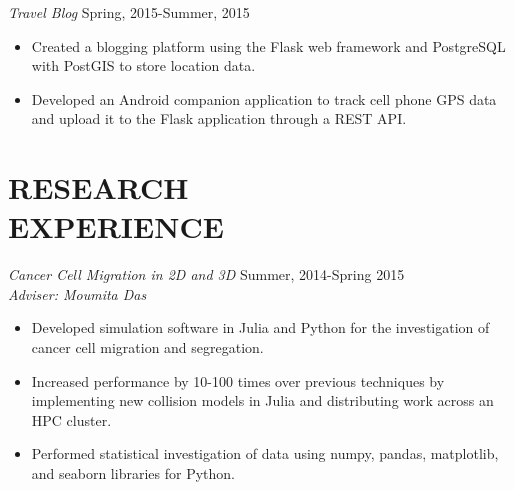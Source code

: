 \documentclass[margin]{res}
\begin{document}
\begin{resume}
\begin{itemize}
  \end{itemize}
  {\sl Travel Blog} \hfill            Spring, 2015-Summer, 2015 \\
  \begin{itemize}
    \item Created a blogging platform using the Flask web framework and PostgreSQL with PostGIS to store location data.
    \item Developed an Android companion application to track cell phone GPS data
      and upload it to the Flask application through a REST API.
  \end{itemize}
      



\section{RESEARCH\\EXPERIENCE}
  {\sl Cancer Cell Migration in 2D and 3D} \hfill  Summer, 2014-Spring 2015\\
  {\sl Adviser: Moumita Das}\\                
  \begin{itemize}
    \item Developed simulation software in Julia and Python for the investigation of cancer cell migration and segregation.
    \item Increased performance by 10-100 times over previous techniques by implementing new collision models in Julia and distributing work across an HPC cluster.
    \item Performed statistical investigation of data using numpy, pandas, matplotlib, and seaborn libraries for Python.
  \end{itemize}
     




\end{resume}
\end{document}
